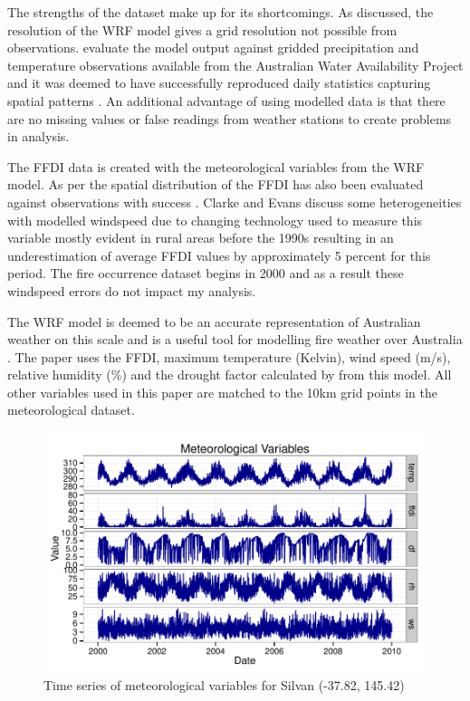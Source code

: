 \documentclass[11pt,a4paper]{article}
\begin{document}
The strengths of the dataset make up for its shortcomings. As discussed, the resolution of the WRF model gives a grid resolution not possible from observations. \citet{evans10} evaluate the model output against gridded precipitation and temperature observations available from the Australian Water Availability Project and it was deemed to have successfully reproduced daily statistics capturing spatial patterns  \citep{evans10, clarkeevans13}. An additional advantage of using modelled data is that there are no missing values or false readings from weather stations to create problems in analysis.

The FFDI data is created with the meteorological variables from the WRF model. As per \citet{clarkeevans13} the spatial distribution of the FFDI has also been evaluated against observations with success  \citep{sanabria13}. Clarke and Evans discuss some heterogeneities with modelled windspeed due to changing technology used to measure this variable mostly evident in rural areas before the 1990s resulting in an underestimation of average FFDI values by approximately 5 percent for this period. The fire occurrence dataset begins in 2000 and as a result these windspeed errors do not impact my analysis.

The WRF model \citep{evans10} is deemed to be an accurate representation of Australian weather on this scale and is a useful tool for modelling fire weather over Australia \citep{clarke2013}. The paper uses the FFDI, maximum temperature (Kelvin), wind speed (m/s), relative humidity (\%) and the drought factor calculated by \citet{clarke2013}  from this model. All other variables used in this paper are matched to the 10km grid points in the meteorological dataset.

\begin{figure}
  \centering
  	\includegraphics[width=1\columnwidth]{figures/silvan.pdf}
  \caption{Time series of meteorological variables for Silvan (-37.82, 145.42)}
  \label{fig:silv}
\end{figure}
\end{document}
